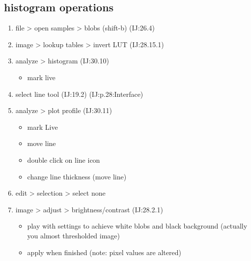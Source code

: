 \documentclass[11pt]{article}
\begin{document}
\subsection{histogram operations}
\label{sec-1-9}
\begin{enumerate}
\item file > open samples > blobs (shift-b) (IJ:26.4)
\item image > lookup tables > invert LUT (IJ:28.15.1)
\item analyze > histogram (IJ:30.10)
\begin{itemize}
\item mark live
\end{itemize}
\item select line tool (IJ:19.2) (IJ:p.28:Interface)
\item analyze > plot profile (IJ:30.11)
\begin{itemize}
\item mark Live
\item move line
\item double click on line icon
\item change line thickness (move line)
\end{itemize}
\item edit > selection > select none
\item image > adjust > brightness/contrast (IJ:28.2.1)
\begin{itemize}
\item play with settings to achieve white blobs and black background (actually you almost thresholded image)
\item apply when finished (note: pixel values are altered)
\end{itemize}


\end{enumerate}
\end{document}
